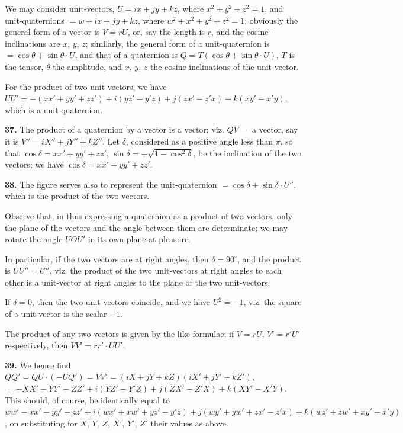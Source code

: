 \documentclass[11pt,a4paper]{article}
\theoremstyle{definition}
\begin{document}
We may consider unit-vectors, $U = ix + jy + kz$, where $x^2 + y^2 + z^2 = 1$, and unit-quaternions $= w + ix + jy + kz$, where $w^2 + x^2 + y^2 + z^2 = 1$; obviously the general form of a vector is $V = rU$, or, say the length is $r$, and the cosine-inclinations are $x$, $y$, $z$; similarly, the general form of a unit-quaternion is $= \cos\theta + \sin\theta \cdot U$, and that of a quaternion is $Q = T(\cos\theta + \sin\theta \cdot U)$, $T$ is the tensor, $\theta$ the amplitude, and $x$, $y$, $z$ the cosine-inclinations of the unit-vector.

For the product of two unit-vectors, we have $UU' = -(xx' + yy' + zz') + i(yz' - y'z) + j(zx' - z'x) + k(xy' - x'y)$, which is a unit-quaternion.

\textbf{37.} The product of a quaternion by a vector is a vector; viz. $QV =$ a vector, say it is $V'' = iX'' + jY'' + kZ''$. Let $\delta$, considered as a positive angle less than $\pi$, so that $\cos\delta = xx' + yy' + zz'$, $\sin\delta = +\sqrt{1 - \cos^2\delta}$, be the inclination of the two vectors; we have $\cos\delta = xx' + yy' + zz'$.

\textbf{38.} The figure serves also to represent the unit-quaternion $= \cos\delta + \sin\delta \cdot U''$, which is the product of the two vectors.

Observe that, in thus expressing a quaternion as a product of two vectors, only the plane of the vectors and the angle between them are determinate; we may rotate the angle $UOU'$ in its own plane at pleasure.

In particular, if the two vectors are at right angles, then $\delta = 90^{\circ}$, and the product is $UU'' = U''$, viz. the product of the two unit-vectors at right angles to each other is a unit-vector at right angles to the plane of the two unit-vectors.

If $\delta = 0$, then the two unit-vectors coincide, and we have $U^2 = -1$, viz. the square of a unit-vector is the scalar $-1$.

The product of any two vectors is given by the like formulae; if $V = rU$, $V' = r'U'$ respectively, then $VV' = rr' \cdot UU'$.

\textbf{39.} We hence find $QQ' = QU \cdot (-UQ') = VV' = (iX + jY + kZ)(iX' + jY' + kZ')$, $= -XX' - YY' - ZZ' + i(YZ' - Y'Z) + j(ZX' - Z'X) + k(XY' - X'Y)$. This should, of course, be identically equal to $ww' - xx' - yy' - zz' + i(wx' + xw' + yz' - y'z) + j(wy' + yw' + zx' - z'x) + k(wz' + zw' + xy' - x'y)$, on substituting for $X$, $Y$, $Z$, $X'$, $Y'$, $Z'$ their values as above.
\end{document}
